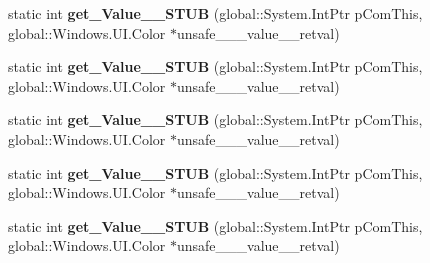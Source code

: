 \begin{DoxyCompactItemize}
\item 
\mbox{\label{struct_system_1_1_nullable___a___windows___u_i___color___v_______impl_1_1_vtbl_acfed473d56912c2c32e8aa5d8787d663}} 
static int {\bfseries get\+\_\+\+Value\+\_\+\+\_\+\+S\+T\+UB} (global\+::\+System.\+Int\+Ptr p\+Com\+This, global\+::\+Windows.\+U\+I.\+Color $\ast$unsafe\+\_\+\+\_\+\+\_\+value\+\_\+\+\_\+retval)
\item 
\mbox{\label{struct_system_1_1_nullable___a___windows___u_i___color___v_______impl_1_1_vtbl_acfed473d56912c2c32e8aa5d8787d663}} 
static int {\bfseries get\+\_\+\+Value\+\_\+\+\_\+\+S\+T\+UB} (global\+::\+System.\+Int\+Ptr p\+Com\+This, global\+::\+Windows.\+U\+I.\+Color $\ast$unsafe\+\_\+\+\_\+\+\_\+value\+\_\+\+\_\+retval)
\item 
\mbox{\label{struct_system_1_1_nullable___a___windows___u_i___color___v_______impl_1_1_vtbl_acfed473d56912c2c32e8aa5d8787d663}} 
static int {\bfseries get\+\_\+\+Value\+\_\+\+\_\+\+S\+T\+UB} (global\+::\+System.\+Int\+Ptr p\+Com\+This, global\+::\+Windows.\+U\+I.\+Color $\ast$unsafe\+\_\+\+\_\+\+\_\+value\+\_\+\+\_\+retval)
\item 
\mbox{\label{struct_system_1_1_nullable___a___windows___u_i___color___v_______impl_1_1_vtbl_acfed473d56912c2c32e8aa5d8787d663}} 
static int {\bfseries get\+\_\+\+Value\+\_\+\+\_\+\+S\+T\+UB} (global\+::\+System.\+Int\+Ptr p\+Com\+This, global\+::\+Windows.\+U\+I.\+Color $\ast$unsafe\+\_\+\+\_\+\+\_\+value\+\_\+\+\_\+retval)
\item 
\mbox{\label{struct_system_1_1_nullable___a___windows___u_i___color___v_______impl_1_1_vtbl_acfed473d56912c2c32e8aa5d8787d663}} 
static int {\bfseries get\+\_\+\+Value\+\_\+\+\_\+\+S\+T\+UB} (global\+::\+System.\+Int\+Ptr p\+Com\+This, global\+::\+Windows.\+U\+I.\+Color $\ast$unsafe\+\_\+\+\_\+\+\_\+value\+\_\+\+\_\+retval)
\end{DoxyCompactItemize}
